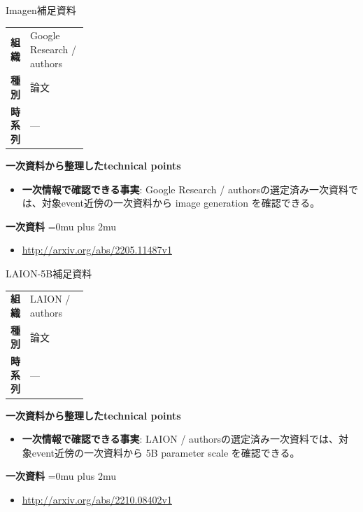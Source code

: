 \begin{technicalnote}{Imagen}{補足資料}
\begingroup
\begin{tabularx}{\linewidth}{@{}>{\bfseries}p{0.22\linewidth}X@{}}
組織 & Google Research / authors \\
種別 & 論文 \\
時系列 & — \\
\end{tabularx}
\smallskip
{\bfseries 一次資料から整理したtechnical points}
\begin{itemize}[leftmargin=1.5em,itemsep=0.35em]
\item \textbf{一次情報で確認できる事実}: Google Research / authorsの選定済み一次資料では、対象event近傍の一次資料から image generation を確認できる。
\end{itemize}
\begin{minipage}{\linewidth}
\begin{samepage}
{\bfseries 一次資料}
\begingroup\sloppy
\Urlmuskip=0mu plus 2mu\relax
\begin{itemize}[leftmargin=1.5em,itemsep=0.25em]
\item {\scriptsize\url{http://arxiv.org/abs/2205.11487v1}}
\end{itemize}
\endgroup
\end{samepage}
\end{minipage}
\endgroup
\end{technicalnote}
\medskip

\begin{technicalnote}{LAION-5B}{補足資料}
\begingroup
\begin{tabularx}{\linewidth}{@{}>{\bfseries}p{0.22\linewidth}X@{}}
組織 & LAION / authors \\
種別 & 論文 \\
時系列 & — \\
\end{tabularx}
\smallskip
{\bfseries 一次資料から整理したtechnical points}
\begin{itemize}[leftmargin=1.5em,itemsep=0.35em]
\item \textbf{一次情報で確認できる事実}: LAION / authorsの選定済み一次資料では、対象event近傍の一次資料から 5B parameter scale を確認できる。
\end{itemize}
\begin{minipage}{\linewidth}
\begin{samepage}
{\bfseries 一次資料}
\begingroup\sloppy
\Urlmuskip=0mu plus 2mu\relax
\begin{itemize}[leftmargin=1.5em,itemsep=0.25em]
\item {\scriptsize\url{http://arxiv.org/abs/2210.08402v1}}
\end{itemize}
\endgroup
\end{samepage}
\end{minipage}
\endgroup
\end{technicalnote}
\medskip


